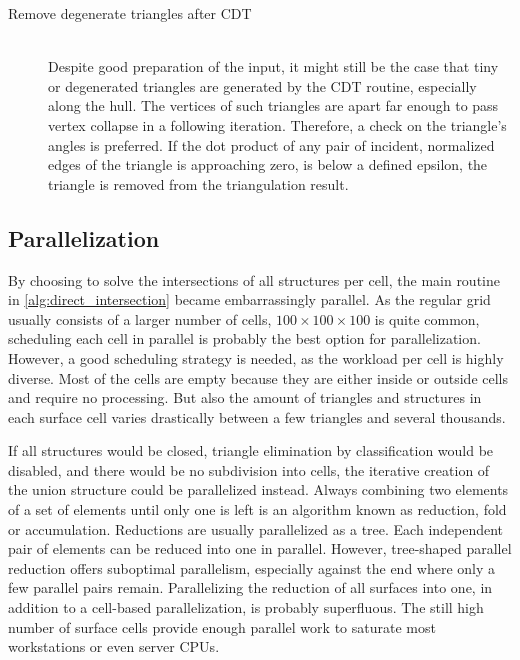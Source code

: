 \begin{description}
	\item[Remove degenerate triangles after CDT] \hfill \\
	Despite good preparation of the input, it might still be the case that tiny or degenerated triangles are generated by the CDT routine, especially along the hull.
	The vertices of such triangles are apart far enough to pass vertex collapse in a following iteration.
	Therefore, a check on the triangle's angles is preferred.
	If the dot product of any pair of incident, normalized edges of the triangle is approaching zero, \ie is below a defined epsilon, the triangle is removed from the triangulation result.
\end{description}


\subsection{Parallelization}
\label{sec:parallelization}

By choosing to solve the intersections of all structures per cell, the main routine in \cref{alg:direct_intersection} became embarrassingly parallel.
As the regular grid usually consists of a larger number of cells, \eg $100 \times 100 \times 100$ is quite common, scheduling each cell in parallel is probably the best option for parallelization.
However, a good scheduling strategy is needed, as the workload per cell is highly diverse.
Most of the cells are empty because they are either inside or outside cells and require no processing.
But also the amount of triangles and structures in each surface cell varies drastically between a few triangles and several thousands.

If all structures would be closed, \ie triangle elimination by classification would be disabled, and there would be no subdivision into cells, the iterative creation of the union structure could be parallelized instead.
Always combining two elements of a set of elements until only one is left is an algorithm known as reduction, fold or accumulation.
Reductions are usually parallelized as a tree.
Each independent pair of elements can be reduced into one in parallel.
However, tree-shaped parallel reduction offers suboptimal parallelism, especially against the end where only a few parallel pairs remain.
Parallelizing the reduction of all surfaces into one, in addition to a cell-based parallelization, is probably superfluous.
The still high number of surface cells provide enough parallel work to saturate most workstations or even server CPUs.


